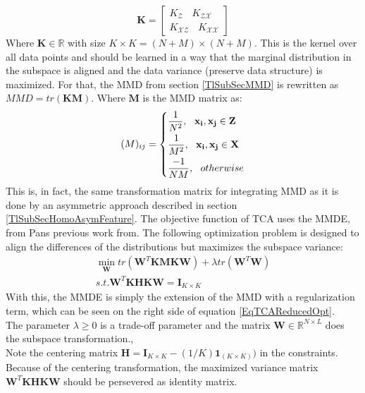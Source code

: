 \begin{equation}\label{EqTCAKernel}
\mathbf{K} = 
	\begin{bmatrix}
	K_{\mathcal{Z}}\>\>\>\> K_{\mathcal{ZX}} \\
	K_{\mathcal{XZ}}\>\>\>\> K_{\mathcal{XX}}
	\end{bmatrix}
\end{equation}
Where $\mathbf{K} \in \mathbb{R}$ with size $K\times K = (N + M) \times (N+ M)$.
This is the kernel over all data points and should be learned in a way that the marginal distribution in the subspace is aligned and the data variance (preserve data structure) is maximized.
For that, the \acs{MMD} from section \ref{TlSubSecMMD} is rewritten as $MMD=tr(\mathbf{KM})$.
Where $\mathbf{M}$ is the \acs{MMD} matrix as:\cite{Pan.2011}
\begin{equation}\label{EqTCAMMD}
(M)_{ij}= \begin{dcases}
\frac{1}{N^2},\>\>\> \mathbf{x_i},\mathbf{x_j} \in \mathbf{Z}\\
\frac{1}{M^2},\>\>\> \mathbf{x_i},\mathbf{x_j} \in \mathbf{X}\\
\frac{-1}{NM},\>\>\> otherwise
\end{dcases}
\end{equation}
This is, in fact, the same transformation matrix for integrating \acs{MMD} as it is done by an asymmetric approach described in section \ref{TlSubSecHomoAsymFeature}.
The objective function of \acs{TCA} uses the \ac{MMDE}, from Pans previous work from\cite{Pan.2008}. The following optimization problem is designed to align the differences of the distributions but maximizes the subspace variance:\cite{Pan.2011}
\begin{equation}\label{EqTCAReducedOpt}
\begin{gathered}
\min_{\mathbf{W}}  tr(\mathbf{W}^T\mathbf{KMKW}) + \lambda tr(\mathbf{W}^T\mathbf{W})\\
s.t. \mathbf{W}^T\mathbf{KHKW} = \mathbf{I}_{K \times K}
\end{gathered}
\end{equation}
With this, the \acs{MMDE} is simply the extension of the \acl{MMD} with a regularization term, which can be seen on the right side of equation \eqref{EqTCAReducedOpt}.\cite{Pan.2011}\\
The parameter $\lambda \ge 0$ is a trade-off parameter and the matrix $\mathbf{W} \in \mathbb{R}^{N\times L}$ does the subspace transformation.\cite{Pan.2011},\\
Note the centering matrix $\mathbf{H} = \mathbf{I}_{K\times K} - (1/K)\mathbf{1}_{(K\times K)})$ in the constraints. Because of the centering transformation, the maximized variance matrix $\mathbf{W}^T\mathbf{KHKW}$ should be persevered as identity matrix.\\
